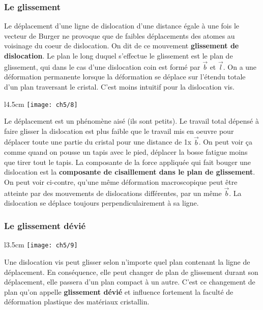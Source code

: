 		\subsubsection{Le glissement}
			Le déplacement d'une ligne de dislocation d'une distance égale à une fois le vecteur de Burger ne provoque que de faibles déplacements des atomes au voisinage du coeur de dislocation. On dit de ce mouvement \textbf{glissement de dislocation}. Le plan le long duquel s'effectue le glissement est le plan de glissement, qui dans le cas d'une dislocation coin est formé par $\vec{b}$ et $\vec{l}$. On a une déformation permanente lorsque la déformation se déplace sur l'étendu totale d'un plan traversant le cristal. C'est moins intuitif pour la dislocation vis.  \\
	\begin{wrapfigure}[10]{l}{4.5cm}
	\vspace{-9mm}
	\texttt{[image: ch5/8]}
	\end{wrapfigure}
	Le déplacement est un phénomène aisé (ils sont petits). Le travail total dépensé à faire glisser la dislocation est plus faible que le travail mis en oeuvre pour déplacer toute une partie du cristal pour une distance de 1x $\vec{b}$. On peut voir ça comme quand on pousse un tapis avec le pied, déplacer la bosse fatigue moins que tirer tout le tapis. La composante de la force appliquée qui fait bouger une dislocation est la \textbf{composante de cisaillement dans le plan de glissement}. \\
	On peut voir ci-contre, qu'une même déformation macroscopique peut être atteinte par des mouvements de dislocations différentes, par un même $\vec{b}$. La dislocation se déplace toujours perpendiculairement à sa ligne. 
	
	\subsubsection{Le glissement dévié}
		\begin{wrapfigure}[6]{l}{3.5cm}
		\vspace{-5mm}
		\texttt{[image: ch5/9]}
		\end{wrapfigure}
		Une dislocation vis peut glisser selon n'importe quel plan contenant la ligne de déplacement. En conséquence, elle peut changer de plan de glissement durant son déplacement, elle passera d'un plan compact à un autre. C'est ce changement de plan qu'on appelle \textbf{glissement dévié} et influence fortement la faculté de déformation plastique des matériaux cristallin. 
		
